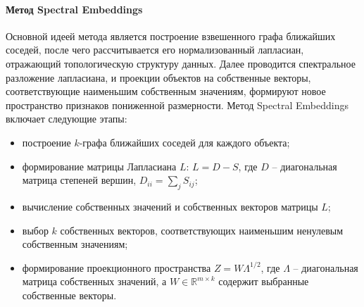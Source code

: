         \paragraph{Метод Spectral Embeddings}
            Основной идеей метода является построение взвешенного графа ближайших соседей, после чего рассчитывается его нормализованный лапласиан, отражающий топологическую структуру данных. Далее проводится спектральное разложение лапласиана, и проекции объектов на собственные векторы, соответствующие наименьшим собственным значениям, формируют новое пространство признаков пониженной размерности.
            Метод Spectral Embeddings включает следующие этапы:
            \begin{itemize}
                \item построение \(k\)-графа ближайших соседей для каждого объекта;
                \item формирование матрицы Лапласиана \(L\): \(L = D - S\), где \(D\) -- диагональная матрица степеней вершин, \(D_{ii} = \sum_j S_{ij}\);
                \item вычисление собственных значений и собственных векторов матрицы \(L\);
                \item выбор \(k\) собственных векторов, соответствующих наименьшим ненулевым собственным значениям;
                \item формирование проекционного пространства \(Z = W \Lambda^{1/2}\), где \(\Lambda\) -- диагональная матрица собственных значений, а \(W \in \mathbb{R}^{m \times k}\) содержит выбранные собственные векторы.
            \end{itemize}
